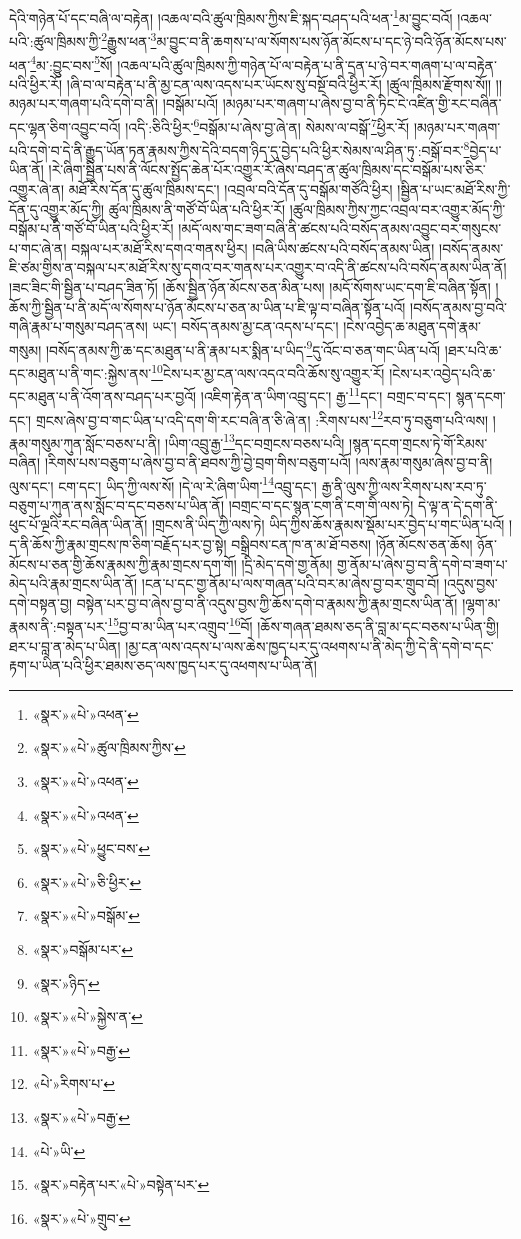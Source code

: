 དེའི་གཉེན་པོ་དང་བཞི་ལ་བརྟེན། །འཆལ་བའི་ཚུལ་ཁྲིམས་ཀྱིས་ཇི་སྐད་བཤད་པའི་ཕན་\footnote{«སྣར་»«པེ་»འཕན་}མ་བྱུང་བའོ། །འཆལ་པའི་:ཚུལ་ཁྲིམས་ཀྱི་\footnote{«སྣར་»«པེ་»ཚུལ་ཁྲིམས་ཀྱིས་}རྒྱུས་ཕན་\footnote{«སྣར་»«པེ་»འཕན་}མ་བྱུང་བ་ནི་ཆགས་པ་ལ་སོགས་པས་ཉོན་མོངས་པ་དང་ཉེ་བའི་ཉོན་མོངས་པས་ཕན་\footnote{«སྣར་»«པེ་»འཕན་}མ་:བྱུང་བས་\footnote{«སྣར་»«པེ་»ཕྱུང་བས་}སོ། །འཆལ་པའི་ཚུལ་ཁྲིམས་ཀྱི་གཉེན་པོ་ལ་བརྟེན་པ་ནི་དྲན་པ་ཉེ་བར་གཞག་པ་ལ་བརྟེན་པའི་ཕྱིར་རོ། །ཞི་བ་ལ་བརྟེན་པ་ནི་མྱ་ངན་ལས་འདས་པར་ཡོངས་སུ་བསྔོ་བའི་ཕྱིར་རོ། །ཚུལ་ཁྲིམས་རྫོགས་སོ།། །།མཉམ་པར་གཞག་པའི་དགེ་བ་ནི། །བསྒོམ་པའོ། །མཉམ་པར་གཞག་པ་ཞེས་བྱ་བ་ནི་ཏིང་ངེ་འཛིན་གྱི་རང་བཞིན་དང་ལྷན་ཅིག་འབྱུང་བའོ། །འདི་:ཅིའི་ཕྱིར་\footnote{«སྣར་»«པེ་»ཅི་ཕྱིར་}བསྒོམ་པ་ཞེས་བྱ་ཞེ་ན། སེམས་ལ་བསྒོ་\footnote{«སྣར་»«པེ་»བསྒོམ་}ཕྱིར་རོ། །མཉམ་པར་གཞག་པའི་དགེ་བ་དེ་ནི་རྒྱུད་ཡོན་ཏན་རྣམས་ཀྱིས་དེའི་བདག་ཉིད་དུ་བྱེད་པའི་ཕྱིར་སེམས་ལ་ཤིན་ཏུ་:བསྒོ་བར་\footnote{«སྣར་»བསྒོམ་པར་}བྱེད་པ་ཡིན་ནོ། །རེ་ཞིག་སྦྱིན་པས་ནི་ལོངས་སྤྱོད་ཆེན་པོར་འགྱུར་རོ་ཞེས་བཤད་ན་ཚུལ་ཁྲིམས་དང་བསྒོམ་པས་ཅིར་འགྱུར་ཞེ་ན། མཐོ་རིས་དོན་དུ་ཚུལ་ཁྲིམས་དང་། །འབྲལ་བའི་དོན་དུ་བསྒོམ་གཙོའི་ཕྱིར། །སྦྱིན་པ་ཡང་མཐོ་རིས་ཀྱི་དོན་དུ་འགྱུར་མོད་ཀྱི། ཚུལ་ཁྲིམས་ནི་གཙོ་བོ་ཡིན་པའི་ཕྱིར་རོ། །ཚུལ་ཁྲིམས་ཀྱིས་ཀྱང་འབྲལ་བར་འགྱུར་མོད་ཀྱི་བསྒོམ་པ་ནི་གཙོ་བོ་ཡིན་པའི་ཕྱིར་རོ། །མདོ་ལས་གང་ཟག་བཞི་ནི་ཚངས་པའི་བསོད་ནམས་འབྱུང་བར་གསུངས་པ་གང་ཞེ་ན། བསྐལ་པར་མཐོ་རིས་དགའ་གནས་ཕྱིར། །བཞི་ཡིས་ཚངས་པའི་བསོད་ནམས་ཡིན། །བསོད་ནམས་ཇི་ཙམ་གྱིས་ན་བསྐལ་པར་མཐོ་རིས་སུ་དགའ་བར་གནས་པར་འགྱུར་བ་འདི་ནི་ཚངས་པའི་བསོད་ནམས་ཡིན་ནོ། །ཟང་ཟིང་གི་སྦྱིན་པ་བཤད་ཟིན་ཏོ། །ཆོས་སྦྱིན་ཉོན་མོངས་ཅན་མིན་པས། །མདོ་སོགས་ཡང་དག་ཇི་བཞིན་སྟོན། །ཆོས་ཀྱི་སྦྱིན་པ་ནི་མདོ་ལ་སོགས་པ་ཉོན་མོངས་པ་ཅན་མ་ཡིན་པ་ཇི་ལྟ་བ་བཞིན་སྟོན་པའོ། །བསོད་ནམས་བྱ་བའི་གཞི་རྣམ་པ་གསུམ་བཤད་ནས། ཡང་། བསོད་ནམས་མྱ་ངན་འདས་པ་དང་། །ངེས་འབྱེད་ཆ་མཐུན་དགེ་རྣམ་གསུམ། །བསོད་ནམས་ཀྱི་ཆ་དང་མཐུན་པ་ནི་རྣམ་པར་སྨིན་པ་ཡིད་\footnote{«སྣར་»ཉིད་}དུ་འོང་བ་ཅན་གང་ཡིན་པའོ། །ཐར་པའི་ཆ་དང་མཐུན་པ་ནི་གང་:སྐྱེས་ནས་\footnote{«སྣར་»«པེ་»སྐྱེས་ན་}ངེས་པར་མྱ་ངན་ལས་འདའ་བའི་ཆོས་སུ་འགྱུར་རོ། །ངེས་པར་འབྱེད་པའི་ཆ་དང་མཐུན་པ་ནི་འོག་ནས་བཤད་པར་བྱའོ། །འཇིག་རྟེན་ན་ཡིག་འབྲུ་དང་། རྒྱ་\footnote{«སྣར་»«པེ་»བརྒྱ་}དང་། བགྲང་བ་དང་། སྙན་དངག་དང་། གྲངས་ཞེས་བྱ་བ་གང་ཡིན་པ་འདི་དག་གི་རང་བཞི་ན་ཅི་ཞེ་ན། :རིགས་པས་\footnote{«པེ་»རིགས་པ་}རབ་ཏུ་བཅུག་པའི་ལས། །རྣམ་གསུམ་ཀུན་སློང་བཅས་པ་ནི། །ཡིག་འབྲུ་རྒྱ་\footnote{«སྣར་»«པེ་»བརྒྱ་}དང་བགྲངས་བཅས་པའི། །སྙན་དངག་གྲངས་ཏེ་གོ་རིམས་བཞིན། །རིགས་པས་བཅུག་པ་ཞེས་བྱ་བ་ནི་ཐབས་ཀྱི་བྱེ་བྲག་གིས་བཅུག་པའོ། །ལས་རྣམ་གསུམ་ཞེས་བྱ་བ་ནི། ལུས་དང་། ངག་དང་། ཡིད་ཀྱི་ལས་སོ། །དེ་ལ་རེ་ཞིག་ཡིག་\footnote{«པེ་»ཡི་}འབྲུ་དང་། རྒྱ་ནི་ལུས་ཀྱི་ལས་རིགས་པས་རབ་ཏུ་བཅུག་པ་ཀུན་ནས་སློང་བ་དང་བཅས་པ་ཡིན་ནོ། །བགྲང་བ་དང་སྙན་ངག་ནི་ངག་གི་ལས་ཏེ། དེ་ལྟ་ན་དེ་དག་ནི་ཕུང་པོ་ལྔའི་རང་བཞིན་ཡིན་ནོ། །གྲངས་ནི་ཡིད་ཀྱི་ལས་ཏེ། ཡིད་ཀྱིས་ཆོས་རྣམས་སྡོམ་པར་བྱེད་པ་གང་ཡིན་པའོ། །ད་ནི་ཆོས་ཀྱི་རྣམ་གྲངས་ཁ་ཅིག་བརྗོད་པར་བྱ་སྟེ། བསྒྲིབས་ངན་ཁ་ན་མ་ཐོ་བཅས། །ཉོན་མོངས་ཅན་ཆོས། ཉོན་མོངས་པ་ཅན་གྱི་ཆོས་རྣམས་ཀྱི་རྣམ་གྲངས་དག་གོ། །དྲི་མེད་དགེ་གྱ་ནོམ། གྱ་ནོམ་པ་ཞེས་བྱ་བ་ནི་དགེ་བ་ཟག་པ་མེད་པའི་རྣམ་གྲངས་ཡིན་ནོ། །ངན་པ་དང་གྱ་ནོམ་པ་ལས་གཞན་པའི་བར་མ་ཞེས་བྱ་བར་གྲུབ་བོ། །འདུས་བྱས་དགེ་བསྟན་བྱ། བསྟེན་པར་བྱ་བ་ཞེས་བྱ་བ་ནི་འདུས་བྱས་ཀྱི་ཆོས་དགེ་བ་རྣམས་ཀྱི་རྣམ་གྲངས་ཡིན་ནོ། །ལྷག་མ་རྣམས་ནི་:བསྟན་པར་\footnote{«སྣར་»བརྟེན་པར་«པེ་»བསྟེན་པར་}བྱ་བ་མ་ཡིན་པར་འགྲུབ་\footnote{«སྣར་»«པེ་»གྲུབ་}བོ། །ཆོས་གཞན་ཐམས་ཅད་ནི་བླ་མ་དང་བཅས་པ་ཡིན་གྱི། ཐར་པ་བླ་ན་མེད་པ་ཡིན། །མྱ་ངན་ལས་འདས་པ་ལས་ཆེས་ཁྱད་པར་དུ་འཕགས་པ་ནི་མེད་ཀྱི་དེ་ནི་དགེ་བ་དང་རྟག་པ་ཡིན་པའི་ཕྱིར་ཐམས་ཅད་ལས་ཁྱད་པར་དུ་འཕགས་པ་ཡིན་ནོ། 